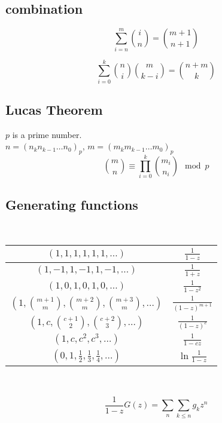	\subsection{combination}
	
	\begin{equation*}
	\sum_{i = n}^m \binom{i}{n} = \binom{m + 1}{n + 1}
	\end{equation*}
	
	\begin{equation*}
	\sum_{i = 0}^k \binom{n}{i} \binom{m}{k - i} = \binom{n + m}{k}
	\end{equation*}
	
	\subsection{Lucas Theorem} $p$ is a prime number.\\
	$n=(n_kn_{k-1}\dots n_0)_p$, $m=(m_km_{k-1}\dots m_0)_p$
	\begin{equation*}
	\binom{m}{n}\equiv \prod_{i=0}^k \binom{m_i}{n_i} \mod p
	\end{equation*}
	
	\subsection{Generating functions}
	
	\
	
	\begin{tabular}{|c|c|}
	    	\hline
	    	$(1,1,1,1,1,1,\ldots)$ & $\frac{1}{1-z}$ \\ \hline
	    	$(1,-1,1,-1,1,-1,\ldots)$ & $\frac{1}{1+z}$ \\ \hline
	    	$(1,0,1,0,1,0,\ldots)$ & $\frac{1}{1-z^2}$ \\ \hline
	    	$(1,\binom{m+1}{m},\binom{m+2}{m},\binom{m+3}{m},\ldots)$ & $\frac{1}{(1-z)^{m+1}}$ \\ \hline
	    	$(1,c,\binom{c+1}{2},\binom{c+2}{3},\ldots)$ & $\frac{1}{(1-z)^c}$ \\ \hline
	    	$(1,c,c^2, c^3, \ldots)$ & $\frac{1}{1-cz}$ \\ \hline
	    	$(0,1,\frac{1}{2},\frac{1}{3},\frac{1}{4},\ldots)$ & $\ln \frac{1}{1-z}$ \\ \hline
	\end{tabular}
	
	\ 
	
	\begin{equation*}
	\frac{1}{1-z}G(z) = \sum_{n}\sum_{k\leq n}g_kz^n
	\end{equation*}
	
